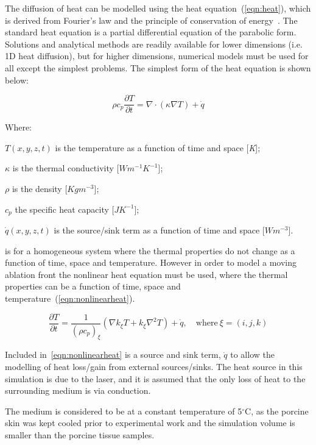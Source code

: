 The diffusion of heat can be modelled using the heat equation~(\cref{eqn:heat}), which is derived from Fourier's law and the principle of conservation of energy~\cite{widder1976heat}.%
The standard heat equation is a partial differential equation of the parabolic form. Solutions and analytical methods are readily available for lower dimensions (i.e. 1D heat diffusion), but for higher dimensions, numerical models must be used for all except the simplest problems. The simplest form of the heat equation is shown below:

\begin{equation}
\rho c_p \frac{\partial T}{\partial t}= \nabla \cdot (\kappa \nabla T) + \dot{q}
\label{eqn:heat}
\end{equation}

\noindent Where:

	\indent $T(x, y, z, t)$ is the temperature as a function of time and space [\textit{K}];
	
	\indent $\kappa$ is the thermal conductivity [$W m^{-1} K^{-1}$];
	
	\indent $\rho$ is the density [$Kg  m^{-3}$];
	
	\indent $c_p$ the specific heat capacity [$J K^{-1}$];
	
	\indent $\dot{q}(x,y,z,t)$ is the source/sink term as a function of time and space [$W m^{-3}$].
	
	\medskip

 is for a homogeneous system where the thermal properties do not change as a function of time, space and temperature. However in order to model a moving ablation front the nonlinear heat equation must be used, where the thermal properties can be a function of time, space and temperature~(\cref{eqn:nonlinearheat}).

\begin{equation}
\frac{\partial T}{\partial t} = \frac{1}{(\rho c_p)_{\xi}}(\nabla k_\xi T + k_\xi\nabla^2T)+\dot{q},\quad \text{where}\ \xi=(i,j,k)
\label{eqn:nonlinearheat}
\end{equation}

Included in~\cref{eqn:nonlinearheat} is a source and sink term, $\dot{q}$ to allow the modelling of heat loss/gain from external sources/sinks. The heat source in this simulation is due to the laser, and it is assumed that the only loss of heat to the surrounding medium is via conduction.
	
The medium is considered to be at a constant temperature of 5$^{\circ}$C, as the porcine skin was kept cooled prior to experimental work and the simulation volume is smaller than the porcine tissue samples. 

